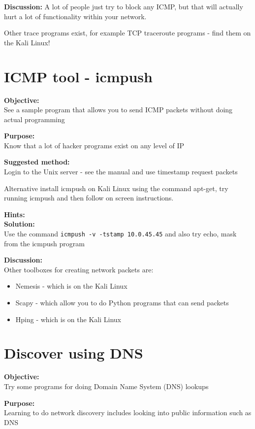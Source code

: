 \documentclass[a4paper,11pt,notitlepage]{report}
\begin{document}
{\bf Discussion:}
A lot of people just try to block any ICMP, but that will actually hurt a lot of functionality within your network.

Other trace programs exist, for example TCP traceroute programs - find them on the Kali Linux!

\chapter{ICMP tool - icmpush}
\label{ex:icmpush}

{\bf Objective:} \\
See a sample program that allows you to send ICMP packets without doing actual programming

{\bf Purpose:}\\
Know that a lot of hacker programs exist on any level of IP

{\bf Suggested method:} \\
Login to the Unix server - see the manual and use timestamp request packets

Alternative install icmpush on Kali Linux using the command apt-get, try running icmpush and
then follow on screen instructions.

{\bf Hints:} \\

{\bf Solution:}\\
Use the command \verb+icmpush -v -tstamp 10.0.45.45+
and also try echo, mask from the icmpush program

{\bf Discussion:}\\
Other toolboxes for creating network packets are:
\begin{itemize}
\item Nemesis - which is on the Kali Linux
\item Scapy - which allow you to do Python programs that can send packets
\item Hping - which is on the Kali Linux
\end{itemize}


\chapter{Discover using DNS}
\label{ex:basic-dns-lookup}

{\bf Objective:}\\
Try some programs for doing Domain Name System (DNS) lookups

{\bf Purpose:}\\
Learning to do network discovery includes looking into public information such as DNS
\end{document}
